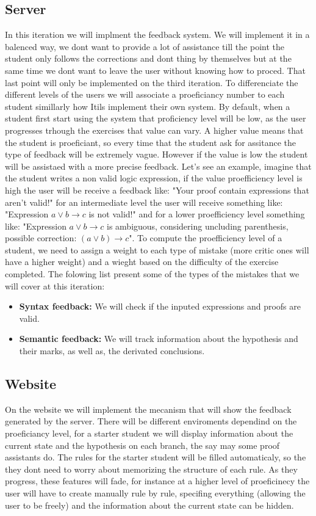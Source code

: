 \subsection{Server}
In this iteration we will implment the feedback system. We will implement it in a balenced way, we dont want to provide a lot of assistance till the point the student only follows the corrections and dont thing by themselves but at the same time we dont want to leave the user without knowing how to proced. That last point will only be implemented on the third  iteration. To differenciate the different levels of the users we will associate a proeficiancy number to each student simillarly how Itils implement their own system.  By default, when a student first start using the system that proficiency level will be low, as the user progresses trhough the exercises that value can vary. A higher value means that the student is proeficiant, so every time that the student ask for assitance the type of feedback will be extremely vague. However if the value is low the student will be assistaed with a more precise feedback. Let's see an example, imagine that the student writes a non valid logic expression, if the value proefficiency level is high the user will be receive a feedback like: "Your proof contain expressions that aren't valid!" for an intermediate level the user will receive something like: "Expression \(a \lor b \to c\) is not valid!" and for a lower proefficiency level something like:
"Expression \(a \lor b \to c\) is ambiguous, considering uncluding parenthesis, possible correction: \((a \lor b) \to c\)". To compute the proefficiency level of a student, we need to assign a weight to each type of mistake (more critic ones will have a higher weight) and a wieght based on the difficulty of the exercise completed. The folowing list present some of the types of the mistakes that we will cover at this iteration:

\begin{itemize}
    \item \textbf{Syntax feedback:} We will check if the inputed expressions and proofs  are valid.
    \item \textbf{Semantic feedback:} We will track information about the hypothesis and their marks, as well as, the derivated conclusions.
\end{itemize}

\subsection{Website}
On the website we will implement the mecanism that will show the feedback generated by the server. There will be different enviroments dependind on the proeficiancy level, for a starter student we will display information about the current state and the hypothesis on each branch, the say may some proof assistants do. The rules for the starter student will be filled automaticaly, so the they dont need to worry about memorizing the structure of each rule. As they progress, these features will fade, for instance at a higher level of proeficinecy the user will have to create manually rule by rule, specifing everything (allowing the user to be freely) and the information about the current state can be hidden.

